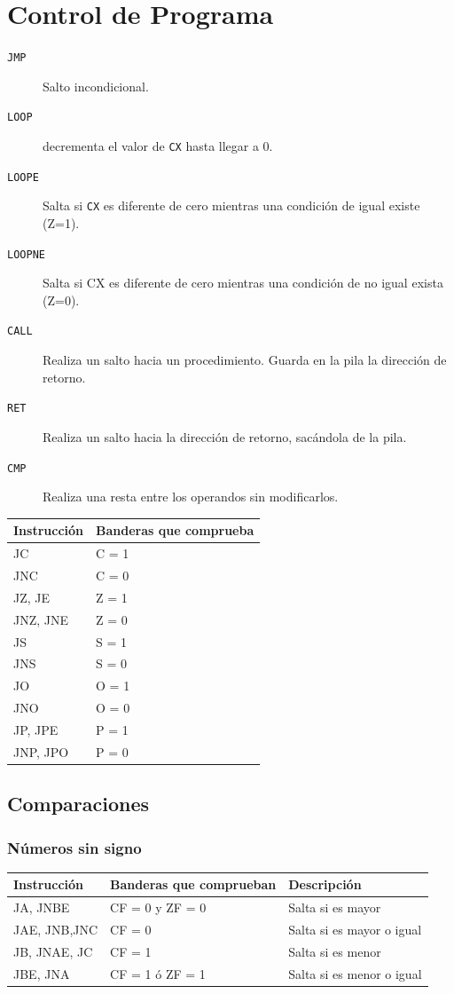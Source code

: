 \documentclass[12pt]{article}
\begin{document}
\section*{Control de Programa}
\label{sec:org814f672}
\begin{description}
\item[{\texttt{JMP}}] Salto incondicional.
\item[{\texttt{LOOP}}] decrementa el valor de \texttt{CX} hasta llegar a 0.
\item[{\texttt{LOOPE}}] Salta si \texttt{CX} es diferente de cero mientras una condición de igual existe (Z=1).
\item[{\texttt{LOOPNE}}] Salta si CX es diferente de cero mientras una condición de no igual exista (Z=0).
\item[{\texttt{CALL}}] Realiza un salto hacia un procedimiento. Guarda en la pila la dirección de retorno.
\item[{\texttt{RET}}] Realiza un salto hacia la dirección de retorno, sacándola de la pila.
\item[{\texttt{CMP}}] Realiza una resta entre los operandos sin modificarlos.
\end{description}

\begin{center}
\begin{tabular}{|l|l|}
\hline
Instrucción & Banderas que comprueba\\
\hline
JC & C = 1\\
JNC & C = 0\\
JZ, JE & Z = 1\\
JNZ, JNE & Z = 0\\
JS & S = 1\\
JNS & S = 0\\
JO & O = 1\\
JNO & O = 0\\
JP, JPE & P = 1\\
JNP, JPO & P = 0\\
\hline
\end{tabular}
\end{center}

\subsection*{Comparaciones}
\label{sec:org335fdca}
\subsubsection*{Números sin signo}
\label{sec:orgc081fbe}
\begin{center}
\begin{tabular}{|l|l|l|}
\hline
Instrucción & Banderas que comprueban & Descripción\\
\hline
JA, JNBE & CF = 0 y ZF = 0 & Salta si es mayor\\
JAE, JNB,JNC & CF = 0 & Salta si es mayor o igual\\
JB, JNAE, JC & CF = 1 & Salta si es menor\\
JBE, JNA & CF = 1 ó ZF = 1 & Salta si es menor o igual\\
\hline
\end{tabular}
\end{center}
\end{document}
